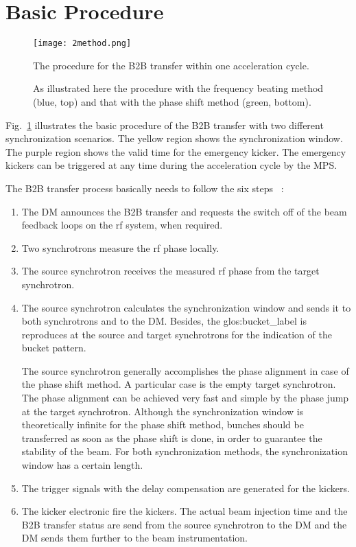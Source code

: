 \section{Basic Procedure}
\begin{figure}[!htb]
   \centering   
   \texttt{[image: 2method.png]}
   \caption{The procedure for the B2B transfer within one acceleration cycle.}
	\caption*{As illustrated here the procedure with the frequency beating method (blue, top) and that with the phase shift method (green, bottom).}
   \label{2method}
\end{figure}
Fig.~\ref{2method} illustrates the basic procedure of the B2B transfer with two different synchronization scenarios. The yellow region shows the synchronization window. The purple region shows the valid time for the emergency kicker. The emergency kickers can be triggered at any time during the acceleration cycle by the MPS.  


The B2B transfer process basically needs to follow the six steps ~\cite{bai_bunch_2015}:
\begin{enumerate}
\item The DM announces the B2B transfer and requests the switch off of the beam feedback loops on the rf system, when required.
\item Two synchrotrons measure the rf phase locally.
\item The source synchrotron receives the measured rf phase from the target synchrotron.
\item The source synchrotron calculates the synchronization window and sends it to both synchrotrons and to the DM. Besides, the \gls{glos:bucket_label} is reproduces at the source and target synchrotrons for the indication of the bucket pattern.

The source synchrotron generally accomplishes the phase alignment in case of the phase shift method. A particular case is the empty target synchrotron. The phase alignment can be achieved very fast and simple by the phase jump at the target synchrotron. Although the synchronization window is theoretically infinite for the phase shift method, bunches should be transferred as soon as the phase shift is done, in order to guarantee the stability of the beam. For both synchronization methods, the synchronization window has a certain length.

\item The trigger signals with the delay compensation are generated for the kickers.
\item The kicker electronic fire the kickers. The actual beam injection time and the B2B transfer status are send from the source synchrotron to the DM and the DM sends them further to the beam instrumentation.

\end{enumerate}



